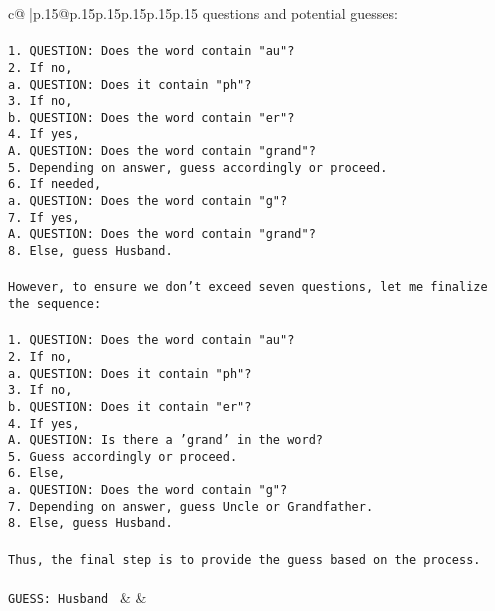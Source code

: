 \documentclass{article}
\begin{document}
{\begin{supertabular}{c@{$\;$}|p{.15\linewidth}@{}p{.15\linewidth}p{.15\linewidth}p{.15\linewidth}p{.15\linewidth}p{.15\linewidth}}
{{{questions and potential guesses:\\ \tt \\ \tt 1. QUESTION: Does the word contain "au"?  \\ \tt 2. If no,  \\ \tt    a. QUESTION: Does it contain "ph"?  \\ \tt 3. If no,  \\ \tt    b. QUESTION: Does the word contain "er"?  \\ \tt 4. If yes,  \\ \tt    A. QUESTION: Does the word contain "grand"?  \\ \tt 5. Depending on answer, guess accordingly or proceed.  \\ \tt 6. If needed,  \\ \tt    a. QUESTION: Does the word contain "g"?  \\ \tt 7. If yes,  \\ \tt    A. QUESTION: Does the word contain "grand"?  \\ \tt 8. Else, guess Husband.\\ \tt \\ \tt However, to ensure we don't exceed seven questions, let me finalize the sequence:\\ \tt \\ \tt 1. QUESTION: Does the word contain "au"?  \\ \tt 2. If no,  \\ \tt    a. QUESTION: Does it contain "ph"?  \\ \tt 3. If no,  \\ \tt    b. QUESTION: Does it contain "er"?  \\ \tt 4. If yes,  \\ \tt    A. QUESTION: Is there a 'grand' in the word?  \\ \tt 5. Guess accordingly or proceed.  \\ \tt 6. Else,  \\ \tt    a. QUESTION: Does the word contain "g"?  \\ \tt 7. Depending on answer, guess Uncle or Grandfather.  \\ \tt 8. Else, guess Husband.\\ \tt \\ \tt Thus, the final step is to provide the guess based on the process.\\ \tt \\ \tt GUESS: Husband 
	  } 
	   } 
	   } 
	 & & \\ 
 


\end{supertabular}}
\end{document}
